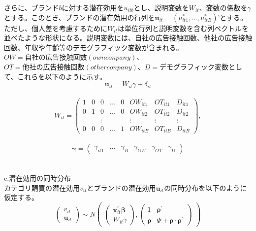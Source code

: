 \documentclass[11pt]{jsarticle}
\begin{document}
さらに、ブランド$b$に対する潜在効用を$u_{itb}$とし、説明変数を$W_{it}$、変数の係数を$\gamma$ とする。このとき、ブランドの潜在効用の行列を$\textbf{u}_{it} = (u_{it1}^{*},...,u_{itB}^{*})’$とする。ただし、個人差を考慮するために$W_{it}$は単位行列と説明変数を含む列ベクトルを並べたような形状になる。説明変数には、自社の広告接触回数、他社の広告接触回数、年収や年齢等のデモグラフィック変数が含まれる。$OW = 自社の広告接触回数(own conpany)$、$OT = 他社の広告接触回数(other conpany)$、$D =デモグラフィック変数$として、これらを以下のように示す。\\
\begin{equation} \label{formulab2}
\textbf{u}_{it} = W_{it}\gamma + \delta_{it}
\end{equation}\\
\begin{equation} \label{formulab3}
  W_{it} =
  \begin{pmatrix}
      1 & 0 & 0 & \ldots & 0 & OW_{it1} & OT_{it1} & D_{it1} \\
      0 & 1 & 0 & \ldots & 0 & OW_{it2} & OT_{it2} & D_{it2} \\
       &  & \vdots &  &  & \vdots & \vdots & \vdots \\
      0 & 0 & 0 & \ldots & 1 & OW_{itB} & OT_{itB} & D_{itB}
    \end{pmatrix}
    ,
\end{equation}\\
\begin{equation} \label{formulab4}
  \boldsymbol{\gamma} =
  \begin{pmatrix}
      \gamma_{it1} & \ldots & \gamma_{B} & \gamma_{OW} & \gamma_{OT} & \gamma_{D}
   \end{pmatrix}
\end{equation}\\
\\
c.潜在効用の同時分布\\
カテゴリ購買の潜在効用$v_{it}$とブランドの潜在効用$\textbf{u}_{it}$の同時分布を以下のように仮定する。\\
\begin{equation} \label{formulac1}
  \begin{pmatrix}
      v_{it} \\
      \textbf{u}_{it} 
   \end{pmatrix}
   \sim N
  \begin{pmatrix}
    \begin{pmatrix}
    \boldsymbol{x}^{\prime}_{it}\boldsymbol{\beta}\\
    W_{it}\gamma
    \end{pmatrix}
    ,
    \begin{pmatrix}
    1 & {\boldsymbol \rho}^\prime\\
    {\boldsymbol \rho} & \Psi + {\boldsymbol \rho} \cdot {\boldsymbol \rho}^\prime
    \end{pmatrix}
  \end{pmatrix}
\end{equation}\\
\end{document}
